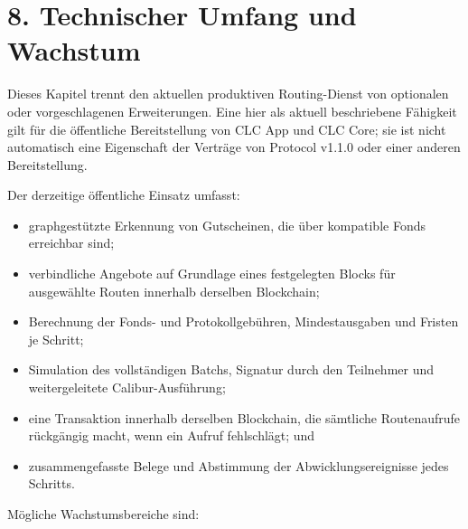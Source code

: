 \documentclass[11pt]{article}
\begin{document}
\section*{8. Technischer Umfang und Wachstum}

Dieses Kapitel trennt den aktuellen produktiven Routing-Dienst von optionalen oder vorgeschlagenen Erweiterungen. Eine hier als aktuell beschriebene Fähigkeit gilt für die öffentliche Bereitstellung von CLC App und CLC Core; sie ist nicht automatisch eine Eigenschaft der Verträge von Protocol v1.1.0 oder einer anderen Bereitstellung.

Der derzeitige öffentliche Einsatz umfasst:

\begin{itemize}[leftmargin=*]
\item graphgestützte Erkennung von Gutscheinen, die über kompatible Fonds erreichbar sind;
\item verbindliche Angebote auf Grundlage eines festgelegten Blocks für ausgewählte Routen innerhalb derselben Blockchain;
\item Berechnung der Fonds- und Protokollgebühren, Mindestausgaben und Fristen je Schritt;
\item Simulation des vollständigen Batchs, Signatur durch den Teilnehmer und weitergeleitete Calibur-Ausführung;
\item eine Transaktion innerhalb derselben Blockchain, die sämtliche Routenaufrufe rückgängig macht, wenn ein Aufruf fehlschlägt; und
\item zusammengefasste Belege und Abstimmung der Abwicklungsereignisse jedes Schritts.
\end{itemize}
Mögliche Wachstumsbereiche sind:
\end{document}
